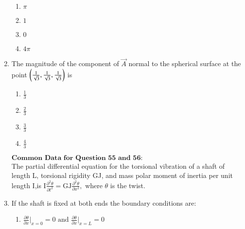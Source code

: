 \documentclass[journal]{IEEEtran}
\begin{document}
\begin{enumerate}[start=49]
\begin{multicols}{4}
    \begin{enumerate}
        \item $\pi$
        \item $1$
        \item $0$
        \item $4\pi$        
    \end{enumerate}
\end{multicols}
\bigskip
\item The magnitude of the component of $\overrightarrow{A}$ normal to the spherical surface at the point $\left(\frac{1}{\sqrt{3}},\frac{1}{\sqrt{3}},\frac{1}{\sqrt{3}}\right)$ is 
\begin{multicols}{4}
    \begin{enumerate}
        \item $\frac{1}{3}$
        \item $\frac{2}{3}$
        \item $\frac{3}{3}$
        \item $\frac{4}{3}$        
    \end{enumerate}
\end{multicols}
\bigskip
$\textbf{Common Data for Question 55 and 56:}$\\
The partial differential equation for the torsional vibration of a shaft of length L, torsional rigidity GJ, and mass polar moment of inertia per unit length I,is $\text{I}\frac{\partial^{2}\theta}{\partial t^{2}}=\text{GJ}\frac{\partial^{2}\theta}{\partial x^{2}},$ where $\theta$ is the twist. \bigskip
\item If the shaft is fixed at both ends the boundary conditions are:
\begin{multicols}{2}
    \begin{enumerate}
        \item $\frac{\partial \theta}{\partial x}\bigg|_{x=0}=0 \text{ and } \frac{\partial \theta}{\partial x} \bigg|_{x=L}=0$
		

\end{enumerate}
\end{multicols}
\end{enumerate}
\end{document}
